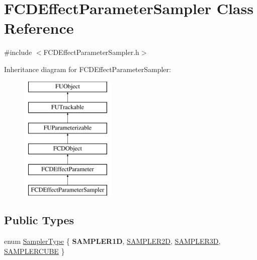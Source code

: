 \hypertarget{classFCDEffectParameterSampler}{
\section{FCDEffectParameterSampler Class Reference}
\label{classFCDEffectParameterSampler}
}


{\ttfamily \#include $<$FCDEffectParameterSampler.h$>$}

Inheritance diagram for FCDEffectParameterSampler:\begin{figure}[H]
\begin{center}
\leavevmode
\includegraphics[height=6.000000cm]{classFCDEffectParameterSampler}
\end{center}
\end{figure}
\subsection*{Public Types}
\begin{DoxyCompactItemize}
\item 
enum \hyperlink{classFCDEffectParameterSampler_ae3a82d31b80b3510bb44a62bd3c34424}{SamplerType} \{ {\bfseries SAMPLER1D}, 
\hyperlink{classFCDEffectParameterSampler_ae3a82d31b80b3510bb44a62bd3c34424a3e0a98b613cd47287b74402a45dcd2df}{SAMPLER2D}, 
\hyperlink{classFCDEffectParameterSampler_ae3a82d31b80b3510bb44a62bd3c34424a705723cc55960ee3b2d6744e3244cd48}{SAMPLER3D}, 
\hyperlink{classFCDEffectParameterSampler_ae3a82d31b80b3510bb44a62bd3c34424a4c3851e3bc494f054f2e45efd74e107d}{SAMPLERCUBE}
 \}
\end{DoxyCompactItemize}
